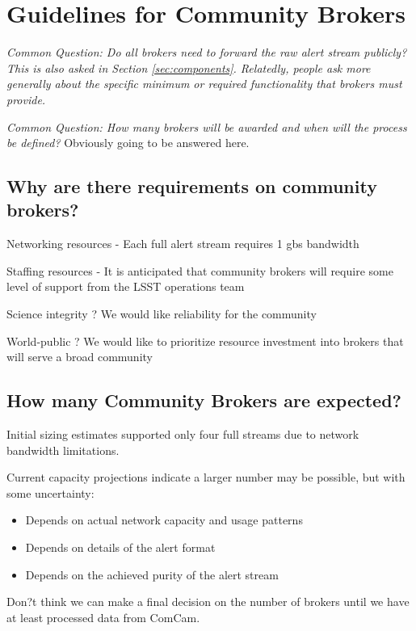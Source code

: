 \section{Guidelines for Community Brokers}\label{sec:community_brokers}

{\it Common Question: Do all brokers need to forward the raw alert stream publicly? This is also asked in Section \ref{sec:components}. Relatedly, people ask more generally about the specific minimum or required functionality that brokers must provide.}

{\it Common Question: How many brokers will be awarded and when will the process be defined?} Obviously going to be answered here.

\subsection{Why are there requirements on community brokers?}

Networking resources - Each full alert stream requires 1 gbs bandwidth

Staffing resources - It is anticipated that community brokers will require some level of support from the LSST operations team

Science integrity ? We would like reliability for the community

World-public ? We would like to prioritize resource investment into brokers that will serve a broad community

\subsection{How many Community Brokers are expected?}

Initial sizing estimates supported only four full streams due to network bandwidth limitations.

Current capacity projections indicate a larger number may be possible, but with some uncertainty:

\begin{itemize}
	\item Depends on actual network capacity and usage patterns

	\item Depends on details of the alert format

	\item Depends on the achieved purity of the alert stream
\end{itemize}

Don?t think we can make a final decision on the number of brokers until we have at least processed data from ComCam.


